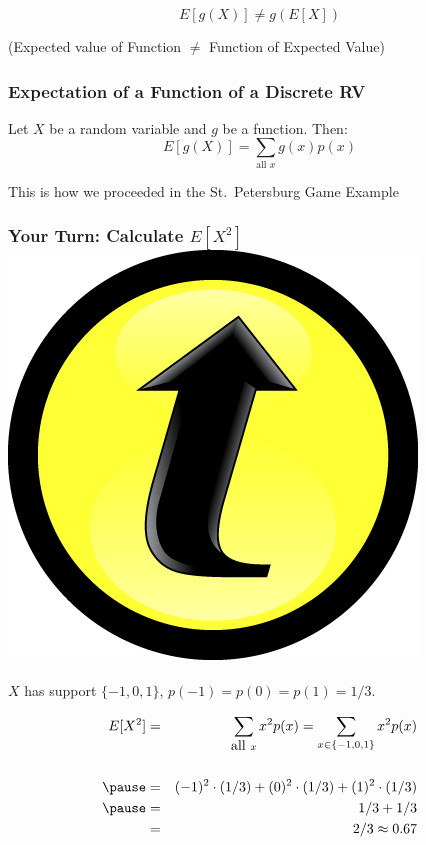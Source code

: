 \documentclass[handout]{beamer}
\begin{document}


\begin{frame}
\huge $$E[g(X)] \neq g(E[X])$$
\begin{center}
	\large (Expected value of Function $\neq$ Function of Expected Value)
\end{center}


\end{frame}

\begin{frame}
\frametitle{Expectation of a Function of a Discrete RV}
Let $X$ be a random variable and $g$ be a function. Then:
$$\boxed{E[g(X)] = \sum_{\mbox{all } x} g(x) p(x)}$$


 \alert{This is how we proceeded in the St.\ Petersburg Game Example}
\end{frame}
\begin{frame}
\frametitle{Your Turn: Calculate $E[X^2]$ \hfill \includegraphics[scale = 0.05]{./images/clicker}}
$X$ has support $\{-1, 0, 1\}$, $p(-1) = p(0) = p(1) = 1/3$.
\pause

\begin{eqnarray*}
 E[X^2] &=&  \sum_{\mbox{all } x} x^2 p(x) = \sum_{x \in \{-1, 0, 1\}} x^2 p(x) \\ \\ \pause
 	&=& (-1)^2 \cdot (1/3) + (0)^2 \cdot (1/3) + (1)^2 \cdot (1/3)\\ \pause
 	&=& 1/3 + 1/3\\ 
 	&=& 2/3 \approx 0.67
\end{eqnarray*}

\end{frame}
\end{document}
